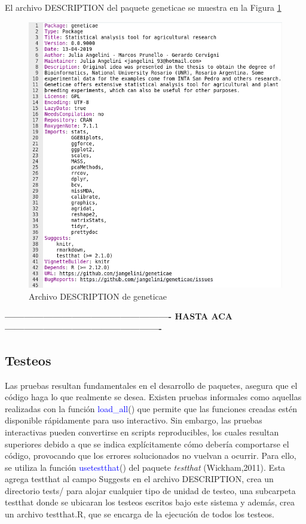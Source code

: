 El archivo DESCRIPTION del paquete geneticae se muestra en la Figura \ref{fig:fig33}

 \begin{figure}[H]
	\begin{center}
		\includegraphics[width=13cm]{./Graficos/DESCRIPTION.png}	
	\end{center}
	\caption{Archivo DESCRIPTION de geneticae}
	\label{fig:fig33}
\end{figure}


\textbf{----------------------------------------------------
	HASTA ACA
-------------------------------------------------}

\subsection{Testeos}

Las pruebas resultan fundamentales en el desarrollo de paquetes, asegura que el código haga lo que realmente se desea. Existen pruebas informales como aquellas realizadas con la función \textcolor{blue}{load\_all}() que permite que las funciones creadas estén disponible rápidamente para uso interactivo. Sin embargo, las pruebas interactivas pueden convertirse en scripts reproducibles, los cuales resultan superiores debido a que se indica explícitamente cómo debería comportarse el código, provocando que los errores solucionados no vuelvan a ocurrir. Para ello, se utiliza la función \textcolor{blue}{usetestthat}() del paquete \emph{testthat} (Wickham,2011). Esta agrega testthat al campo Suggests en el archivo DESCRIPTION, crea un directorio tests/ para alojar cualquier tipo de unidad de testeo, una subcarpeta testthat donde se ubicaran los testeos escritos bajo este sistema y además, crea un archivo testthat.R, que se encarga de la ejecución de todos los testeos.  

